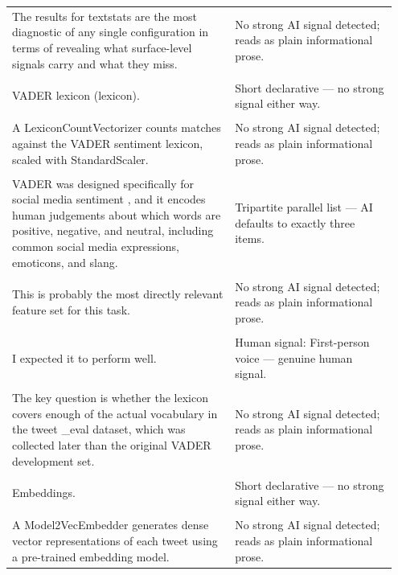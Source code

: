 \documentclass[11pt]{article}
\begin{document}
\begin{longtable}{|p{0.55\linewidth}|p{0.40\linewidth}|}
\hline
\rule{0pt}{3.5cm} & \\
\hline
The results for textstats are the most diagnostic of any single configuration in terms of revealing what surface-level signals carry and what they miss. & No strong AI signal detected; reads as plain informational prose. \\[2pt]
\hline
\rule{0pt}{3.5cm} & \\
\hline
VADER lexicon (lexicon). & Short declarative --- no strong signal either way. \\[2pt]
\hline
\rule{0pt}{3.5cm} & \\
\hline
A LexiconCountVectorizer counts matches against the VADER sentiment lexicon, scaled with StandardScaler. & No strong AI signal detected; reads as plain informational prose. \\[2pt]
\hline
\rule{0pt}{3.5cm} & \\
\hline
VADER was designed specifically for social media sentiment , and it encodes human judgements about which words are positive, negative, and neutral, including common social media expressions, emoticons, and slang. & Tripartite parallel list --- AI defaults to exactly three items. \\[2pt]
\hline
\rule{0pt}{3.5cm} & \\
\hline
This is probably the most directly relevant feature set for this task. & No strong AI signal detected; reads as plain informational prose. \\[2pt]
\hline
\rule{0pt}{3.5cm} & \\
\hline
I expected it to perform well. & Human signal: First-person voice --- genuine human signal. \\[2pt]
\hline
\rule{0pt}{3.5cm} & \\
\hline
The key question is whether the lexicon covers enough of the actual vocabulary in the tweet \_eval dataset, which was collected later than the original VADER development set. & No strong AI signal detected; reads as plain informational prose. \\[2pt]
\hline
\rule{0pt}{3.5cm} & \\
\hline
Embeddings. & Short declarative --- no strong signal either way. \\[2pt]
\hline
\rule{0pt}{3.5cm} & \\
\hline
A Model2VecEmbedder generates dense vector representations of each tweet using a pre-trained embedding model. & No strong AI signal detected; reads as plain informational prose. \\[2pt]
\hline

\end{longtable}
\end{document}
